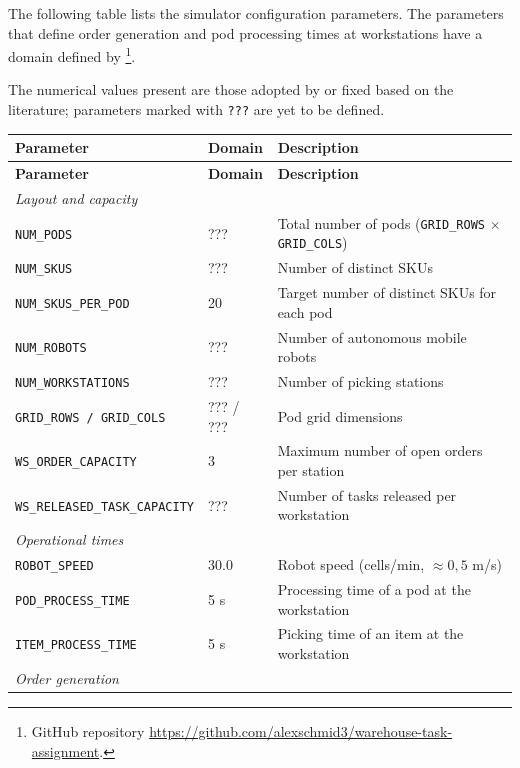 \documentclass[a4paper,10pt]{article}
\begin{document}
The following table lists the simulator configuration parameters.
The parameters that define order generation and pod processing times at workstations have a domain defined by \cite{Barnhart2024}\footnote{GitHub repository \url{https://github.com/alexschmid3/warehouse-task-assignment}.}.

The numerical values present are those adopted by \cite{Barnhart2024} or fixed based on the literature; parameters marked with \texttt{???} are yet to be defined.

\begin{table}[htbp]
\begin{longtable}{p{5cm} p{4.5cm} p{5.5cm}}
\toprule
\textbf{Parameter} & \textbf{Domain} & \textbf{Description} \\
\midrule
\endfirsthead
\toprule
\textbf{Parameter} & \textbf{Domain} & \textbf{Description} \\
\midrule
\endhead
\multicolumn{3}{l}{\textit{Layout and capacity}} \\[2pt]
\texttt{NUM\_PODS}              & ???         & Total number of pods (\texttt{GRID\_ROWS} $\times$ \texttt{GRID\_COLS}) \\
\texttt{NUM\_SKUS}              & ???         & Number of distinct SKUs \\
\texttt{NUM\_SKUS\_PER\_POD}    & 20          & Target number of distinct SKUs for each pod \\
\texttt{NUM\_ROBOTS}            & ???         & Number of autonomous mobile robots \\
\texttt{NUM\_WORKSTATIONS}      & ???         & Number of picking stations \\
\texttt{GRID\_ROWS / GRID\_COLS}& ??? / ???   & Pod grid dimensions \\
\texttt{WS\_ORDER\_CAPACITY}    & 3           & Maximum number of open orders per station \\
\texttt{WS\_RELEASED\_TASK\_CAPACITY} & ???    & Number of tasks released per workstation \\[6pt]
\multicolumn{3}{l}{\textit{Operational times}} \\[2pt]
\texttt{ROBOT\_SPEED}           & 30.0        & Robot speed (cells/min, $\approx 0{,}5$ m/s) \\
\texttt{POD\_PROCESS\_TIME}     & 5 s         & Processing time of a pod at the workstation \\
\texttt{ITEM\_PROCESS\_TIME}    & 5 s         & Picking time of an item at the workstation \\[6pt]
\multicolumn{3}{l}{\textit{Order generation}} \\[2pt]

\end{longtable}
\end{table}
\end{document}

